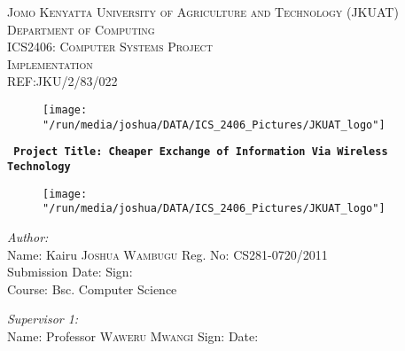 \documentclass[12pt,svgnames,smaller]{article} %
\begin{document}
	\begin{titlepage}
		\begin{center}
			
			
			\textsc{\large Jomo Kenyatta University of Agriculture and Technology (JKUAT)}\\[0.4cm]
			\textsc{\large Department of Computing}\\[0.4cm]
			\textsc{\large ICS2406: Computer Systems Project  }\\[0.3cm]
			\textsc{\large Implementation}\\[0.3cm]
			\textsc{\large REF:JKU/2/83/022 }\\[0.2 cm]
			
			
			\begin{figure}
				\centering
				\texttt{[image: "/run/media/joshua/DATA/ICS\_2406\_Pictures/JKUAT\_logo"]}
				\label{fig:JKUAT_logo}
			\end{figure}
			\textbf{\texttt{ Project Title: Cheaper Exchange of Information Via Wireless Technology }}{\vspace*{20 mm}}
		\end{center}
		
		
		\begin{figure}
			\centering
			\texttt{[image: "/run/media/joshua/DATA/ICS\_2406\_Pictures/JKUAT\_logo"]}
			\label{fig:JKUAT_logo}
		\end{figure}
		
		
		\begin{minipage}{1.0\textwidth}	
			\begin{flushleft} \large
				\emph{Author:}\\
				Name: Kairu \textsc{Joshua Wambugu} Reg. No: CS281-0720/2011 \\
				Submission Date: \hrulefill  Sign: \hrulefill \\
				Course: Bsc. Computer Science
			\end{flushleft}
		\end{minipage}
		
		\begin{minipage}{1.0\textwidth}
			\begin{flushleft} \large
				\emph{Supervisor 1:} \\
				Name: Professor \textsc{Waweru Mwangi} Sign: \hrulefill Date: \hrulefill
			\end{flushleft}
		\end{minipage}
		

\end{titlepage}
\end{document}
